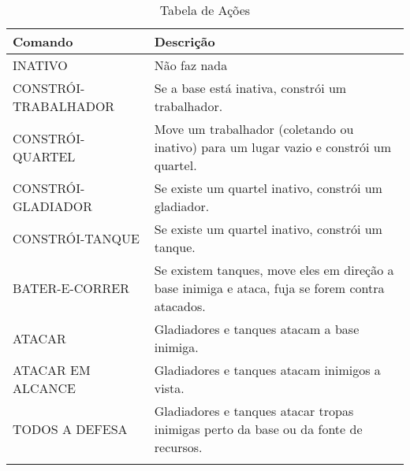 \begin{table}[]
    \begin{tabular}{|l|p{8cm}|}
    \hline
    Comando              & Descrição                                                                                       \\
    \hline
    INATIVO              & Não faz nada                                                                                    \\
    \hline
    CONSTRÓI-TRABALHADOR & Se a base está inativa, constrói um trabalhador.                                                \\
    \hline
    CONSTRÓI-QUARTEL     & Move um trabalhador (coletando ou inativo) para um lugar vazio e constrói um quartel.           \\
    \hline
    CONSTRÓI-GLADIADOR   & Se existe um quartel inativo, constrói um gladiador.                                            \\
    \hline
    CONSTRÓI-TANQUE      & Se existe um quartel inativo, constrói um tanque.                                               \\
    \hline
    BATER-E-CORRER       & Se existem tanques, move eles em direção a base inimiga e ataca, fuja se forem contra atacados. \\
    \hline
    ATACAR               & Gladiadores e tanques atacam a base inimiga.                                                    \\
    \hline
    ATACAR EM ALCANCE    & Gladiadores e tanques atacam inimigos a vista.                                                  \\
    \hline
    TODOS A DEFESA       & Gladiadores e tanques atacar tropas inimigas perto da base ou da fonte de recursos.             \\
    \hline
    \caption{Tabela de Ações}
    \end{tabular}
\end{table}

